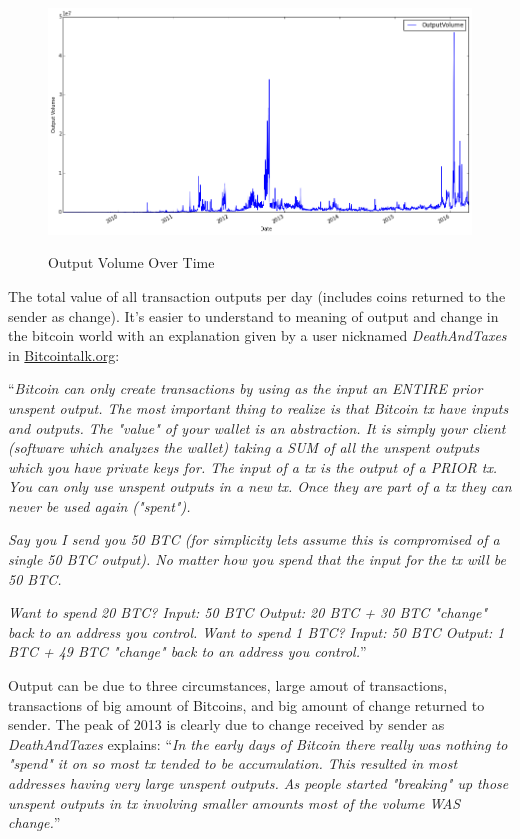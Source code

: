 \begin{figure}[bth]
  \myfloatalign
  {\includegraphics[width=1\linewidth]
    {gfx/output-volume-over-time}}
  \caption{Output Volume
    Over Time}
  \label{fig:output-volume-over-time}
\end{figure}

The total value of all transaction outputs per day (includes coins
returned to the sender as change). It's easier to understand to
meaning of output and change in the bitcoin world with an explanation
given by a user nicknamed \textit{DeathAndTaxes} in
\href{https://bitcointalk.org/index.php?topic=99593.0}{Bitcointalk.org}:

``\textit{Bitcoin can only create transactions by using as the input
  an ENTIRE prior unspent output. The most important thing to realize
  is that Bitcoin tx have inputs and outputs. The "value" of your
  wallet is an abstraction. It is simply your client (software which
  analyzes the wallet) taking a SUM of all the unspent outputs which
  you have private keys for. The input of a tx is the output of a
  PRIOR tx. You can only use unspent outputs in a new tx. Once they
  are part of a tx they can never be used again ("spent").}

\textit{Say you I send you 50 BTC (for simplicity lets assume this is
  compromised of a single 50 BTC output). No matter how you spend that
  the input for the tx will be 50 BTC.}

\textit{Want to spend 20 BTC? Input: 50 BTC Output: 20 BTC + 30 BTC
  "change" back to an address you control. Want to spend 1 BTC? Input:
  50 BTC Output: 1 BTC + 49 BTC "change" back to an address you
  control.}''

Output can be due to three circumstances, large amout of transactions,
transactions of big amount of Bitcoins, and big amount of change
returned to sender. The peak of 2013 is clearly due to change received
by sender as \textit{DeathAndTaxes} explains: ``\textit{In the early
  days of Bitcoin there really was nothing to "spend" it on so most tx
  tended to be accumulation. This resulted in most addresses having
  very large unspent outputs. As people started "breaking" up those
  unspent outputs in tx involving smaller amounts most of the volume
  WAS change.}''

